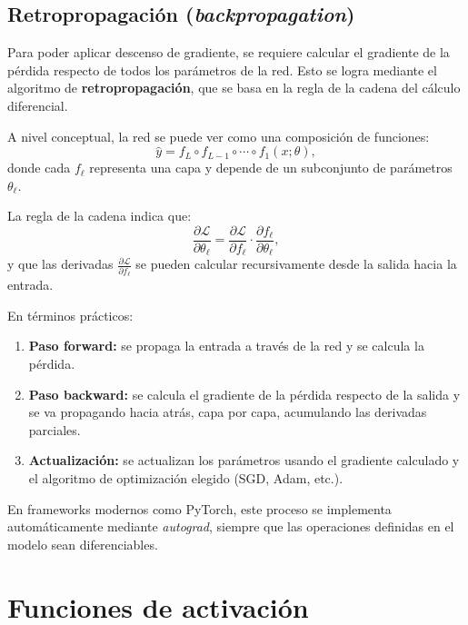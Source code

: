 \subsection{Retropropagación (\textit{backpropagation})}

Para poder aplicar descenso de gradiente, se requiere calcular el gradiente de la pérdida respecto de todos los parámetros de la red. Esto se logra mediante el algoritmo de \textbf{retropropagación}, que se basa en la regla de la cadena del cálculo diferencial.

\hfill

A nivel conceptual, la red se puede ver como una composición de funciones:
\begin{equation}
    \hat{y} = f_L \circ f_{L-1} \circ \cdots \circ f_1(x; \theta),
\end{equation}
donde cada $f_\ell$ representa una capa y depende de un subconjunto de parámetros $\theta_\ell$.

La regla de la cadena indica que:
\begin{equation}
    \frac{\partial \mathcal{L}}{\partial \theta_\ell}
    = \frac{\partial \mathcal{L}}{\partial f_\ell} \cdot 
      \frac{\partial f_\ell}{\partial \theta_\ell},
\end{equation}
y que las derivadas $\frac{\partial \mathcal{L}}{\partial f_\ell}$ se pueden calcular recursivamente desde la salida hacia la entrada.

\hfill

En términos prácticos:
\begin{enumerate}
    \item \textbf{Paso forward:} se propaga la entrada a través de la red y se calcula la pérdida.
    \item \textbf{Paso backward:} se calcula el gradiente de la pérdida respecto de la salida y se va propagando hacia atrás, capa por capa, acumulando las derivadas parciales.
    \item \textbf{Actualización:} se actualizan los parámetros usando el gradiente calculado y el algoritmo de optimización elegido (SGD, Adam, etc.).
\end{enumerate}

En frameworks modernos como PyTorch, este proceso se implementa automáticamente mediante \textit{autograd}, siempre que las operaciones definidas en el modelo sean diferenciables.

\section{Funciones de activación}

